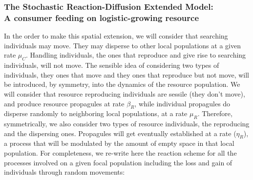 \subsubsection*{{\bfseries The Stochastic Reaction-Diffusion Extended Model: \\ A consumer feeding on logistic-growing resource}}
In the order to make this spatial extension, we will consider that searching individuals may move. They may disperse to other local populations at a given rate $\mu_C$. Handling individuals, the ones that reproduce and give rise to searching individuals, will not move. The sensible idea of considering two types of individuals, they ones that move and they ones that reproduce but not move, will be introduced, by symmetry, into the dynamics of the resource population. We will consider that resource reproducing individuals are sessile (they don't move), and produce resource propagules at rate $\beta_R$, while individual propagules do disperse randomly to neighboring local populations, at a rate $\mu_R$. Therefore, symmetrically, we also consider two types of resource individuals, the reproducing and the dispersing ones. Propagules will get eventually established at a rate ($\eta_R$), a process that will be modulated by the amount of empty space in that local population. For completeness, we re-write here the reaction scheme for all the processes involved on a given focal population including the loss and gain of individuals through random movements:   
